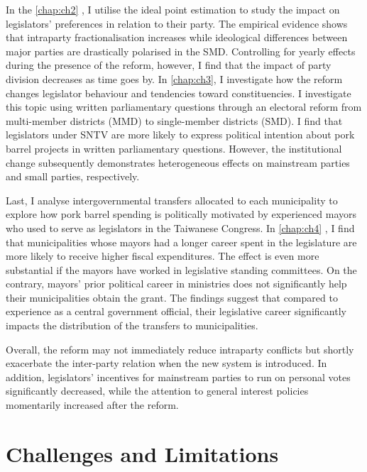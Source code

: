 In the \autoref{chap:ch2} , I utilise the ideal point estimation to study the impact on legislators' preferences in relation to their party. The empirical evidence shows that intraparty fractionalisation increases while ideological differences between major parties are drastically polarised in the SMD. Controlling for yearly effects during the presence of the reform, however, I find that the impact of party division decreases as time goes by. In \autoref{chap:ch3}, I investigate how the reform changes legislator behaviour and tendencies toward constituencies. I investigate this topic using written parliamentary questions through an electoral reform from multi-member districts (MMD) to single-member districts (SMD). I find that legislators under SNTV are more likely to express political intention about pork barrel projects in written parliamentary questions. However, the institutional change subsequently demonstrates heterogeneous effects on mainstream parties and small parties, respectively.  

Last, I analyse intergovernmental transfers allocated to each municipality to explore how pork barrel spending is politically motivated by experienced mayors who used to serve as legislators in the Taiwanese Congress. In \autoref{chap:ch4} , I find that municipalities whose mayors had a longer career spent in the legislature are more likely to receive higher fiscal expenditures. The effect is even more substantial if the mayors have worked in legislative standing committees. On the contrary, mayors' prior political career in ministries does not significantly help their municipalities obtain the grant. The findings suggest that compared to experience as a central government official, their legislative career significantly impacts the distribution of the transfers to municipalities.

Overall, the reform may not immediately reduce intraparty conflicts but shortly exacerbate the inter-party relation when the new system is introduced. In addition, legislators' incentives for mainstream parties to run on personal votes significantly decreased, while the attention to general interest policies momentarily increased after the reform.

\section*{\centering Challenges and Limitations}

